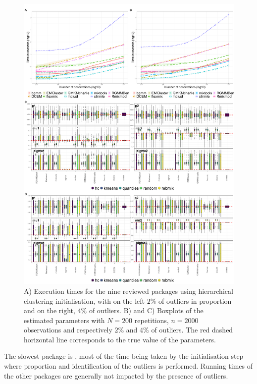 \begin{figure}

{\centering \includegraphics[width=1\linewidth]{figs/univariate/outliers} 

}

\caption{A) Execution times for the nine reviewed packages using hierarchical clustering initialisation, with on the left $2\%$ of outliers in proportion and on the right, $4\%$ of outliers.  B) and C) Boxplots of the estimated parameters with $N=200$ repetitions, $n=2000$ observations and respectively $2\%$ and $4\%$ of outliers. The red dashed horizontal line corresponds to the true value of the parameters.}\label{fig:outliers}
\end{figure}

The slowest package is , most of the time being taken by
the initialisation step where proportion and identification of the
outliers is performed. Running times of the other packages are generally
not impacted by the presence of outliers.

